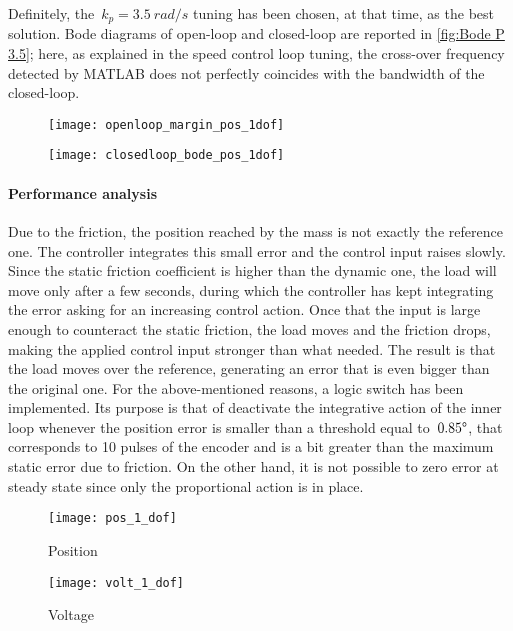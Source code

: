 Definitely, the~$k_p = 3.5\ rad/s$ tuning has been chosen, at that time, as the best solution. Bode diagrams of open-loop and closed-loop are reported in \cref{fig:Bode P 3.5}; here, as explained in the speed control loop tuning, the cross-over frequency detected by MATLAB does not perfectly coincides with the bandwidth of the closed-loop.
\begin{figure*}[h]
	\centering
	\begin{subfigure}{0.45\columnwidth}
		\texttt{[image: openloop\_margin\_pos\_1dof]}
	\end{subfigure}
	\begin{subfigure}{0.45\columnwidth}
		\texttt{[image: closedloop\_bode\_pos\_1dof]}
	\end{subfigure}
	\caption{Bode diagrams with  $k_p=3.5\ rad/s$}
	\label{fig:Bode P 3.5}
\end{figure*}

\paragraph{Performance analysis}
Due to the friction, the position reached by the mass is not exactly the reference one. The controller integrates this small error and the control input raises slowly. Since the static friction coefficient is higher than the dynamic one, the load will move only after a few seconds, during which the controller has kept integrating the error asking for an increasing control action.
Once that the input is large enough to counteract the static friction, the load moves and the friction drops, making the applied control input stronger than what needed. The result is that the load moves over the reference, generating an error that is even bigger than the original one.
For the above-mentioned reasons, a logic switch has been implemented. Its purpose is that of deactivate the integrative action of the inner loop whenever the position error is smaller than a threshold equal to~$0.85 \degree$, that corresponds to 10 pulses of the encoder and is a bit greater than the maximum static error due to friction. On the other hand, it is not possible to zero error at steady state since only the proportional action is in place.
\begin{figure*}
	\centering
	\begin{subfigure}{0.45\columnwidth}
		\texttt{[image: pos\_1\_dof]}
		\caption{Position}
	\end{subfigure}
	\begin{subfigure}{0.45\columnwidth}
		\texttt{[image: volt\_1\_dof]}
		\caption{Voltage}
	\end{subfigure}
	\caption{Step response with $k_p=3.5$}
	\label{fig:Pos_1dof_3.5}
\end{figure*}

